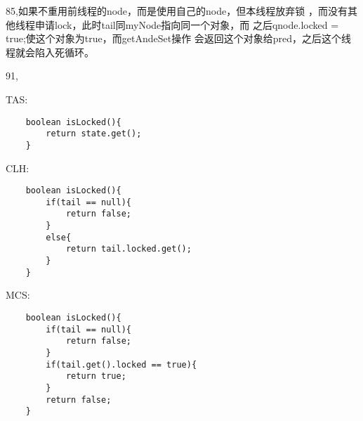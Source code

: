 \documentclass[UTF8]{ctexart}
\begin{document}
85,如果不重用前线程的node，而是使用自己的node，但本线程放弃锁
，而没有其他线程申请lock，此时tail同myNode指向同一个对象，而
之后qnode.locked = true;使这个对象为true，而getAndeSet操作
会返回这个对象给pred，之后这个线程就会陷入死循环。

91,

TAS:
\lstset{language=Java}
\begin{lstlisting}
    boolean isLocked(){
        return state.get();
    }
\end{lstlisting}

CLH:
\lstset{language=Java}
\begin{lstlisting}
    boolean isLocked(){
        if(tail == null){
            return false;
        }
        else{
            return tail.locked.get();
        }
    }
\end{lstlisting}

MCS:

\lstset{language=Java}
\begin{lstlisting}
    boolean isLocked(){
        if(tail == null){
            return false;
        }
        if(tail.get().locked == true){
            return true;
        }
        return false;
    }
\end{lstlisting}
\end{document}
